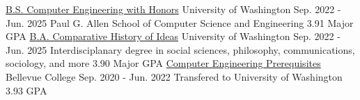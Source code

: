 \vspace{\sectionpadding}
\entry
    {\href{https://www.cs.washington.edu/academics/ugrad}{B.S. Computer Engineering with Honors}}
    {University of Washington}
    {Sep. 2022 - Jun. 2025}
    {
        Paul G. Allen School of Computer Science and Engineering \hfill \color{gray} 3.91 Major GPA \hspace{-0.62em}
    }
\vspace{-0.5ex}
\entry 
    {\href{https://chid.washington.edu/undergraduate-programs}{B.A. Comparative History of Ideas}}
    {University of Washington}
    {Sep. 2022 - Jun. 2025}
    {
        Interdisciplanary degree in social sciences, philosophy, communications, sociology, and more \hfill \color{gray} 3.90 Major GPA \hspace{-0.62em}
    }
\vspace{-0.5ex}
\entry 
    {\href{https://www.bellevuecollege.edu/}{Computer Engineering Prerequisites}}
    {Bellevue College}
    {Sep. 2020 - Jun. 2022}
    {
        Transfered to University of Washington \hfill \color{gray} 3.93 GPA \hspace{-0.62em}
    }
